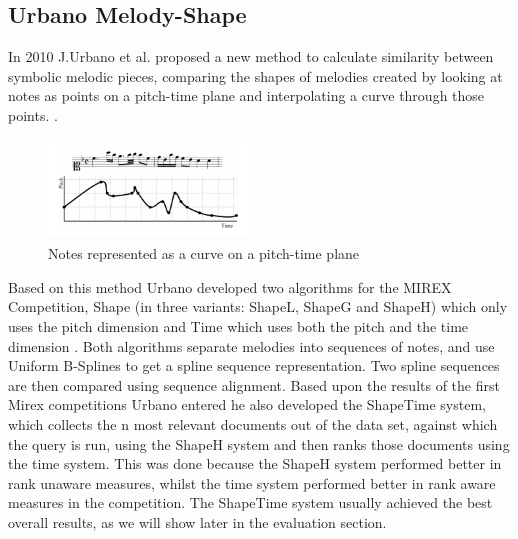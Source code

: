 \documentclass{llncs}
\begin{document}
\begin{itemize}
		\subsection{Urbano Melody-Shape}
        In 2010 J.Urbano et al. proposed a new method to calculate similarity between symbolic melodic pieces, comparing the shapes of melodies created by looking at notes as points on a pitch-time plane and interpolating a curve through those points. \cite{five_point_five}.
           \begin{figure}[h!]
			\centering
	        \includegraphics[width=200px,height=100px,keepaspectratio]{one_of_five_point_one}
				\caption{Notes represented as a curve on a pitch-time plane \cite{five_point_two}}
        	\end{figure}
        Based on this method Urbano developed two algorithms for the MIREX Competition, Shape (in three variants: ShapeL, ShapeG and ShapeH) which only uses the pitch dimension and Time which uses both the pitch and the time dimension \cite{five_point_two}. Both algorithms separate melodies into sequences of notes, and use Uniform B-Splines to get a spline sequence representation. Two spline sequences are then compared using sequence alignment. Based upon the results of the first Mirex competitions Urbano entered he also developed the ShapeTime system, which collects the n most relevant documents out of the data set, against which the query is run, using the ShapeH system and then ranks those documents using the time system. This was done because the ShapeH system performed better in rank unaware measures, whilst the time system performed better in rank aware measures in the competition. The ShapeTime system usually achieved the best overall results, as we will show later in the evaluation section.

\end{itemize}
\end{document}
